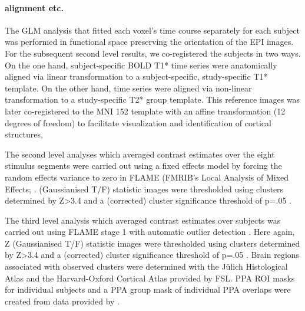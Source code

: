 \documentclass[english]{article}
\begin{document}
\paragraph{alignment etc.}
The GLM analysis that fitted each voxel's time course separately for each
subject was performed in functional space preserving the orientation of the EPI
images.
For the subsequent second level results, we co-registered the subjects in two
ways.
On the one hand, subject-specific BOLD T1* time series were anatomically aligned
via linear transformation to a subject-specific, study-specific T1* template.
On the other hand, time series were aligned via non-linear transformation to a
study-specific T2* group template.
This reference images was later co-registered to the MNI 152 template with an
affine transformation (12 degrees of freedom) to facilitate visualization and
identification of cortical structures,

The second level analyses which averaged contrast estimates over the eight
stimulus segments were carried out using a fixed effects model by forcing the
random effects variance to zero in FLAME (FMRIB's Local Analysis of Mixed
Effects; \citep{beckmann2003general, woolrich2004multilevel}.
(Gaussianised T/F) statistic images were thresholded using clusters determined
by Z>3.4 and a (corrected) cluster significance threshold of p=.05
\citep{worsley2001statistical}.

The third level analysis which averaged contrast estimates over subjects was
carried out using FLAME stage 1 with automatic outlier detection
\citep{beckmann2003general, woolrich2004multilevel, woolrich2008robust}.
Here again, Z (Gaussianised T/F) statistic images were thresholded using
clusters determined by Z>3.4 and a (corrected) cluster significance threshold of
p=.05 \citep{worsley2001statistical}.
Brain regions associated with observed clusters were determined with the Jülich
Histological Atlas \citep{eickhoff2005toolbox, eickhoff2007assignment} and the
Harvard-Oxford Cortical Atlas \citep{desikan2006automated} provided by FSL.
PPA ROI masks for individual subjects and a PPA group mask of individual PPA
overlaps were created from data provided by \citep{sengupta2016extension}.
\end{document}
